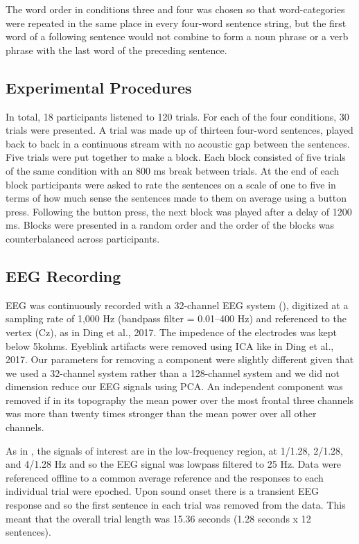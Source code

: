 \documentclass[10pt,letterpaper]{article}
\begin{document}
The word order in conditions three and four was chosen so that
word-categories were repeated in the same place in every four-word
sentence string, but the first word of a following sentence would not
combine to form a noun phrase or a verb phrase with the last word of
the preceding sentence.

\subsection*{Experimental Procedures}

In total, 18 participants listened to 120 trials. For each of the four
conditions, 30 trials were presented. A trial was made up of thirteen
four-word sentences, played back to back in a continuous stream with
no acoustic gap between the sentences. Five trials were put together
to make a block. Each block consisted of five trials of the same
condition with an 800 ms break between trials. At the end of each
block participants were asked to rate the sentences on a scale of one
to five in terms of how much sense the sentences made to them on
average using a button press. Following the button press, the next
block was played after a delay of 1200 ms. Blocks were presented in a
random order and the order of the blocks was counterbalanced across
participants.


\subsection*{EEG Recording}

EEG was continuously recorded with a 32-channel EEG system (),
digitized at a sampling rate of 1,000 Hz (bandpass filter = 0.01–400
Hz) and referenced to the vertex (Cz), as in Ding et al., 2017. The
impedence of the electrodes was kept below 5kohms. Eyeblink artifacts were removed using ICA like in Ding et al., 2017. Our parameters for
removing a component were slightly different given that we used a
32-channel system rather than a 128-channel system and we did not
dimension reduce our EEG signals using PCA. An independent component
was removed if in its topography the mean power over the most frontal
three channels was more than twenty times stronger than the mean power
over all other channels.

As in \cite{DingEtAl2017}, the signals of interest are in the
low-frequency region, at 1/1.28, 2/1.28, and 4/1.28 Hz and so the EEG
signal was lowpass filtered to 25 Hz. Data were referenced offline to
a common average reference and the responses to each individual trial
were epoched. Upon sound onset there is a transient EEG response and
so the first sentence in each trial was removed from the data. This
meant that the overall trial length was 15.36 seconds (1.28 seconds x
12 sentences).
\end{document}
